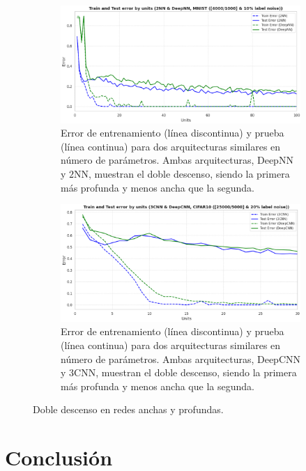 \begin{figure}[htbp]
    \centering
    \begin{subfigure}[b]{0.45\textwidth}
        \centering
        \includegraphics[width=\textwidth]{img/experiments/2nnvsdeepnn.png}
        \caption{Error de entrenamiento (línea discontinua) y prueba (línea continua) para dos arquitecturas similares en número de parámetros. Ambas arquitecturas, DeepNN y $2$NN, muestran el doble descenso, siendo la primera más profunda y menos ancha que la segunda.}\label{fig:2nnvsdeepnn}
    \end{subfigure}
    \hfill 
    \begin{subfigure}[b]{0.45\textwidth} 
        \centering
        \includegraphics[width=\textwidth]{img/experiments/3cnnvsdeepcnn.png}
        \caption{Error de entrenamiento (línea discontinua) y prueba (línea continua) para dos arquitecturas similares en número de parámetros. Ambas arquitecturas, DeepCNN y $3$CNN, muestran el doble descenso, siendo la primera más profunda y menos ancha que la segunda.}\label{fig:3cnnvsdeepcnn}
    \end{subfigure}
    
    \caption[Doble descenso en redes anchas y profundas.]{Doble descenso en redes anchas y profundas.}\label{fig:imagenprincipal}
\end{figure}

\section{Conclusión}\label{sec:conclusion-informatica}

\endinput